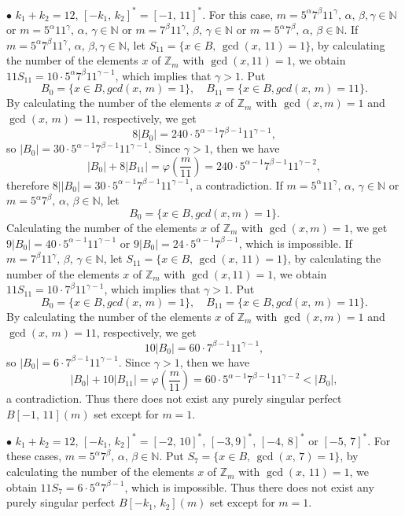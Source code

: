 \documentclass[12pt]{article}
\newtheorem{open problem}{Open problem}[section]
\begin{document}
$\bullet$ $k_1+k_2=12$, $[-k_1, \,k_2]^*=[-1, \,11]^*$. For this case, $m=5^\alpha7^\beta11^\gamma, \, \alpha, \, \beta, \gamma\in\mathbb{N}$ or $m=5^\alpha11^\gamma, \, \alpha, \, \gamma\in\mathbb{N}$ or $m=7^\beta11^\gamma, \,  \beta, \, \gamma\in\mathbb{N}$ or $m=5^\alpha7^\beta, \, \alpha, \, \beta\in\mathbb{N}$. If $m=5^\alpha7^\beta11^\gamma, \, \alpha, \, \beta, \gamma\in\mathbb{N}$, let $S_{11}=\{x\in B, \, \gcd(x, \,11)=1\}$, by calculating the number of the elements $x$ of $\mathbb{Z}_m$ with $\gcd(x, 11)=1$, we obtain $11S_{11}= 10\cdot 5^\alpha7^\beta11^{\gamma-1}$, which implies that $\gamma>1$. Put
$$B_0=\{x\in B, gcd(x, \,m)=1\}, \quad B_{11}=\{x\in B, gcd(x, \,m)=11\}.$$
By calculating the number of the elements $x$ of $\mathbb{Z}_m$ with $\gcd(x, m)=1$ and $\gcd(x, \,m)=11$, respectively, we get
 $$8|B_0|=240\cdot5^{\alpha-1}7^{\beta-1}11^{\gamma-1},$$
 so $|B_0|=30\cdot5^{\alpha-1}7^{\beta-1}11^{\gamma-1}$. Since $\gamma>1$, then we have
 $$|B_0|+8|B_{11}|=\varphi(\frac{m}{11})=240\cdot5^{\alpha-1}7^{\beta-1}11^{\gamma-2},$$ therefore $8||B_0|=30\cdot5^{\alpha-1}7^{\beta-1}11^{\gamma-1}$, a contradiction. If $m=5^\alpha11^\gamma, \, \alpha, \, \gamma\in\mathbb{N}$ or $m=5^\alpha7^\beta, \, \alpha, \, \beta\in\mathbb{N}$, let
 $$B_0=\{x\in B, gcd(x, m)=1\}.$$
 Calculating the number of the elements $x$ of $\mathbb{Z}_m$ with $\gcd(x, m)=1$, we get $9|B_0|=40\cdot5^{\alpha-1}11^{\gamma-1}$ or $9|B_0|=24\cdot5^{\alpha-1}7^{\beta-1}$, which is impossible. If $m=7^\beta11^\gamma, \,  \beta, \, \gamma\in\mathbb{N}$, let $S_{11}=\{x\in B, \, \gcd(x, \,11)=1\}$, by calculating the number of the elements $x$ of $\mathbb{Z}_m$ with $\gcd(x, 11)=1$, we obtain $11S_{11}= 10\cdot 7^\beta11^{\gamma-1}$, which implies that $\gamma>1$. Put
$$B_0=\{x\in B, gcd(x, \,m)=1\}, \quad B_{11}=\{x\in B, gcd(x, \,m)=11\}.$$
By calculating the number of the elements $x$ of $\mathbb{Z}_m$ with $\gcd(x, m)=1$ and $\gcd(x, \,m)=11$, respectively, we get
 $$10|B_0|=60\cdot7^{\beta-1}11^{\gamma-1},$$
 so $|B_0|=6\cdot7^{\beta-1}11^{\gamma-1}$. Since $\gamma>1$, then we have
 $$|B_0|+10|B_{11}|=\varphi(\frac{m}{11})=60\cdot5^{\alpha-1}7^{\beta-1}11^{\gamma-2}<|B_0|,$$  a contradiction. Thus there does not exist any purely singular perfect $B[-1, \,11](m)$ set except for $m=1$.

$\bullet$ $k_1+k_2=12$, $[-k_1, \,k_2]^*=[-2, \,10]^*$, $[-3, 9]^\ast$, $[-4, \,8]^*$ or $[-5, \,7]^\ast$. For these cases, $m=5^\alpha7^\beta, \, \alpha, \, \beta\in\mathbb{N}$. Put
$S_7=\{x\in B, \, \gcd(x, \,7)=1\}$, by calculating the number of the elements $x$ of $\mathbb{Z}_m$ with $\gcd(x, \,11)=1$, we obtain $11S_7= 6\cdot 5^\alpha7^{\beta-1}$, which is impossible.
Thus there does not exist any purely singular perfect $B[-k_1, \,k_2](m)$ set except for $m=1$.
\end{document}
